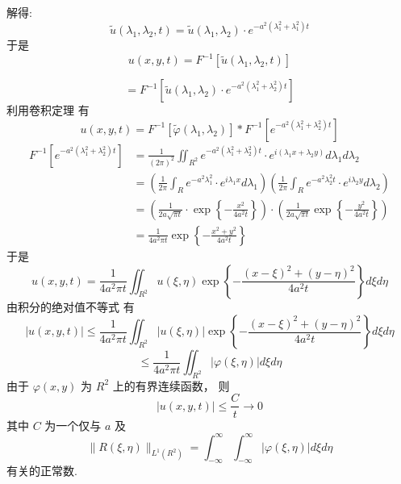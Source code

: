 \begin{questions}
\begin{solution}
解得: 
$$\tilde{u}\left(\lambda_{1}, \lambda_{2}, t\right)=\tilde{u}\left(\lambda_{1}, \lambda_{2}\right) \cdot e^{-a^{2}\left(\lambda_{1}^{2}+\lambda_{1}^{2}\right) t} $$
于是 
$$ u(x, y, t)=F^{-1}\left[\tilde{u}\left(\lambda_{1}, \lambda_{2}, t\right)\right]$$

$$
=F^{-1}\left[\tilde{u}\left(\lambda_{1}, \lambda_{2}\right) \cdot e^{-a^{2}\left(\lambda_{1}^{2}+\lambda_{2}^{2}\right) t}\right]
$$
利用卷积定理
有 
$$u(x, y, t)=F^{-1}\left[\tilde{\varphi}\left(\lambda_{1}, \lambda_{2}\right)\right] * F^{-1}\left[e^{-a^{2}\left(\lambda_{1}^{2}+\lambda_{2}^{2}\right) t}\right] $$
$$
\begin{aligned}
F^{-1}\left[e^{-a^{2}\left(\lambda_{1}^{2}+\lambda_{2}^{2}\right) t}\right] & =\frac{1}{(2 \pi)^{2}} \iint_{R^{2}} e^{-a^{2}\left(\lambda_{1}^{2}+\lambda_{2}^{2}\right) t} \cdot e^{i\left(\lambda_{1} x+\lambda_{2} y\right)} d \lambda_{1} d \lambda_{2} \\
& =\left(\frac{1}{2 \pi} \int_{R}^{}{e^{ -a^{2} \lambda_{1}^{2}}} \cdot e^{i \lambda_{1} x} d \lambda_{1}\right)\left(\frac{1}{2 \pi} \int_{R} e^{-a^{2} \lambda_{2}^{2} t} \cdot e^{i \lambda_{2} y} d \lambda_{2}\right) \\
& =\left(\frac{1}{2 a \sqrt{\pi t}} \cdot \exp \left\{-\frac{x^{2}}{4 a^{2} t}\right\}\right) \cdot\left(\frac{1}{2 a \sqrt{\pi t}} \exp \left\{-\frac{y^{2}}{4 a^{2} t}\right\}\right) \\
& =\frac{1}{4 a^{2} \pi t} \exp \left\{-\frac{x^{2}+y^{2}}{4 a^{2} t}\right\}
\end{aligned}
$$
于是 
$$u(x, y, t)=\frac{1}{4 a^{2} \pi t} \iint_{R^{2}} u(\xi, \eta) \exp \left\{-\frac{(x-\xi)^{2}+(y-\eta)^{2}}{4 a^{2} t}\right\} d \xi d \eta $$
由积分的绝对值不等式
有 
$$ |u(x, y, t)| \leqslant \frac{1}{4 a^{2} \pi t} \iint_{R^{2}}|u(\xi, \eta)| \exp \left\{-\frac{(x-\xi)^{2}+(y-\eta)^{2}}{4 a^{2} t}\right\} d \xi d \eta $$
$$
\leqslant \frac{1}{4 a^{2} \pi t} \iint_{R^{2}}|\varphi(\xi, \eta)| d \xi d \eta
$$
由于 $ \varphi(x, y) $ 为 $R^{2}$ 上的有界连续函数，
则 $$ |u(x, y, t)| \leqslant \frac{C}{t} \rightarrow 0 $$
其中 $C$ 为一个仅与 $a$ 及
$$\|R(\xi, \eta)\|_{L^{1}\left(R^{2}\right)}=\int_{-\infty}^{\infty}\int_{-\infty}^{\infty}|\varphi(\xi, \eta)| d \xi d \eta $$
有关的正常数.




\end{solution}
\end{questions}